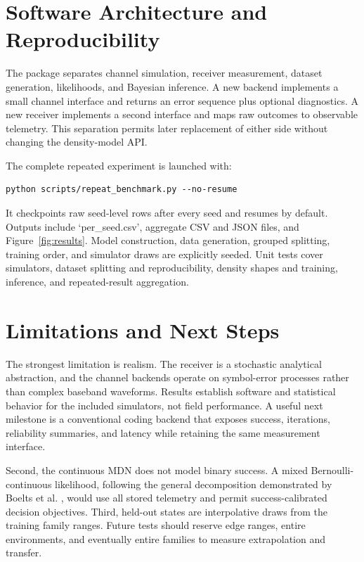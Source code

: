 \documentclass[10pt]{article}
\begin{document}
\section{Software Architecture and Reproducibility}

The package separates channel simulation, receiver measurement, dataset generation, likelihoods, and Bayesian inference. A new backend implements a small channel interface and returns an error sequence plus optional diagnostics. A new receiver implements a second interface and maps raw outcomes to observable telemetry. This separation permits later replacement of either side without changing the density-model API.

The complete repeated experiment is launched with:
\begin{verbatim}
python scripts/repeat_benchmark.py --no-resume
\end{verbatim}
It checkpoints raw seed-level rows after every seed and resumes by default. Outputs include `per\_seed.csv', aggregate CSV and JSON files, and Figure~\ref{fig:results}. Model construction, data generation, grouped splitting, training order, and simulator draws are explicitly seeded. Unit tests cover simulators, dataset splitting and reproducibility, density shapes and training, inference, and repeated-result aggregation.

\section{Limitations and Next Steps}

The strongest limitation is realism. The receiver is a stochastic analytical abstraction, and the channel backends operate on symbol-error processes rather than complex baseband waveforms. Results establish software and statistical behavior for the included simulators, not field performance. A useful next milestone is a conventional coding backend that exposes success, iterations, reliability summaries, and latency while retaining the same measurement interface.

Second, the continuous MDN does not model binary success. A mixed Bernoulli-continuous likelihood, following the general decomposition demonstrated by Boelts et al. \cite{boelts2022flexible}, would use all stored telemetry and permit success-calibrated decision objectives. Third, held-out states are interpolative draws from the training family ranges. Future tests should reserve edge ranges, entire environments, and eventually entire families to measure extrapolation and transfer.
\end{document}
